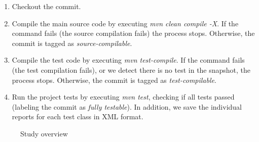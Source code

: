 \begin{enumerate}
    \item Checkout the commit.
    \item Compile the main source code by executing \textit{mvn clean compile -X}. If the command fails (the source compilation fails) the process stops. Otherwise, the commit is tagged as \textit{source-compilable}.
    \item Compile the test code by executing \textit{mvn test-compile}. If the command fails (the test compilation fails), or we detect there is no test in the snapshot, the process stops. Otherwise, the commit is tagged as \textit{test-compilable}.
    \item Run the project tests by executing \textit{mvn test}, checking if all tests passed (labeling the commit as \textit{fully testable}).
    In addition, we save the individual reports for each test class in XML format.
\end{enumerate}


\begin{figure}[h!]
    \centering    
    
    \caption{Study overview }
    \label{fig:methodology-process}
\end{figure}

